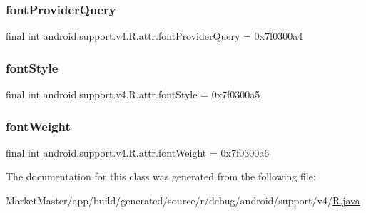 \subsubsection{\texorpdfstring{font\+Provider\+Query}{fontProviderQuery}}
{\footnotesize\ttfamily final int android.\+support.\+v4.\+R.\+attr.\+font\+Provider\+Query = 0x7f0300a4\hspace{0.3cm}{\ttfamily [static]}}

\mbox{\label{classandroid_1_1support_1_1v4_1_1R_1_1attr_a74882a15e37dacc0f0599dabe554eb82}} 
\subsubsection{\texorpdfstring{font\+Style}{fontStyle}}
{\footnotesize\ttfamily final int android.\+support.\+v4.\+R.\+attr.\+font\+Style = 0x7f0300a5\hspace{0.3cm}{\ttfamily [static]}}

\mbox{\label{classandroid_1_1support_1_1v4_1_1R_1_1attr_a26d39aee68d62f1d658b6bdff21fbc76}} 
\subsubsection{\texorpdfstring{font\+Weight}{fontWeight}}
{\footnotesize\ttfamily final int android.\+support.\+v4.\+R.\+attr.\+font\+Weight = 0x7f0300a6\hspace{0.3cm}{\ttfamily [static]}}



The documentation for this class was generated from the following file\+:\begin{DoxyCompactItemize}
\item 
Market\+Master/app/build/generated/source/r/debug/android/support/v4/\mbox{\hyperlink{debug_2android_2support_2v4_2R_8java}{R.\+java}}\end{DoxyCompactItemize}
